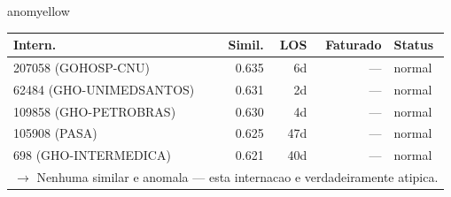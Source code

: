 \documentclass[a4paper,10pt]{article}
\begin{document}
\begin{anomalycard}[Internacao 168228 | GHO-PETROBRAS | MODERADO (z=2.35)]{anomyellow}
\begin{tabular}{l r r r l}\toprule\textbf{Intern.} & \textbf{Simil.} & \textbf{LOS} & \textbf{Faturado} & \textbf{Status} \\\midrule
207058 (GOHOSP-CNU) & 0.635 & 6d & --- & \textcolor{jcubeblue}{normal} \\
62484 (GHO-UNIMEDSANTOS) & 0.631 & 2d & --- & \textcolor{jcubeblue}{normal} \\
109858 (GHO-PETROBRAS) & 0.630 & 4d & --- & \textcolor{jcubeblue}{normal} \\
105908 (PASA) & 0.625 & 47d & --- & \textcolor{jcubeblue}{normal} \\
698 (GHO-INTERMEDICA) & 0.621 & 40d & --- & \textcolor{jcubeblue}{normal} \\
\multicolumn{5}{l}{\textcolor{jcubeblue}{\small $\rightarrow$ Nenhuma similar e anomala --- esta internacao e verdadeiramente atipica.}} \\
\bottomrule\end{tabular}


\end{anomalycard}

\newpage
\end{document}
